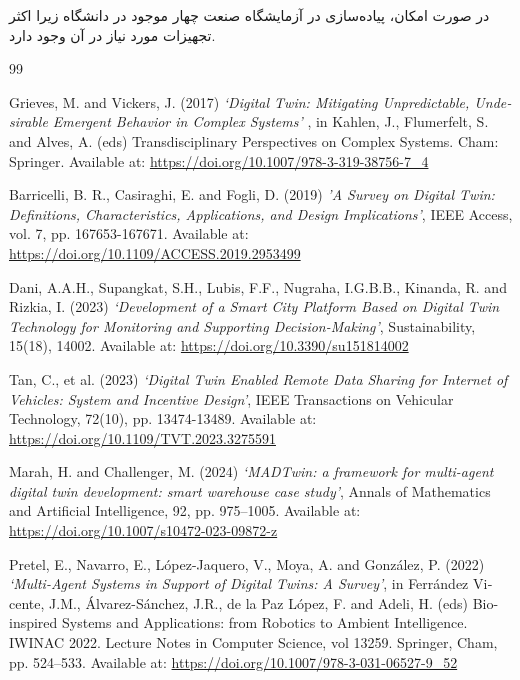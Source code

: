 \documentclass[a4paper,fleqn]{article}
\begin{document}
 در صورت امکان، پیاده‌سازی در آزمایشگاه صنعت چهار موجود در دانشگاه زیرا اکثر تجهیزات مورد نیاز در آن وجود دارد.
 
 


\newpage

\renewcommand{\bibname}{مراجع}



\setLTRbibitems

\begin{thebibliography}{99}

\begin{latin}

Grieves, M. and Vickers, J. (2017) 
\textit{‘Digital Twin: Mitigating Unpredictable, Undesirable Emergent Behavior in Complex Systems’}
, in Kahlen, J., Flumerfelt, S. and Alves, A. (eds) Transdisciplinary Perspectives on Complex Systems. Cham: Springer. Available at: \url{https://doi.org/10.1007/978-3-319-38756-7_4} 

Barricelli, B. R., Casiraghi, E. and Fogli, D. (2019) \textit{'A Survey on Digital Twin: Definitions, Characteristics, Applications, and Design Implications'}, IEEE Access, vol. 7, pp. 167653-167671. Available at: \url{https://doi.org/10.1109/ACCESS.2019.2953499}

Dani, A.A.H., Supangkat, S.H., Lubis, F.F., Nugraha, I.G.B.B., Kinanda, R. and Rizkia, I. (2023) \textit{‘Development of a Smart City Platform Based on Digital Twin Technology for Monitoring and Supporting Decision-Making’}, Sustainability, 15(18), 14002. Available at: \url{https://doi.org/10.3390/su151814002}

Tan, C., et al. (2023) \textit{‘Digital Twin Enabled Remote Data Sharing for Internet of Vehicles: System and Incentive Design’}, IEEE Transactions on Vehicular Technology, 72(10), pp. 13474-13489. Available at: \url{https://doi.org/10.1109/TVT.2023.3275591}

Marah, H. and Challenger, M. (2024) \textit{‘MADTwin: a framework for multi-agent digital twin development: smart warehouse case study’}, Annals of Mathematics and Artificial Intelligence, 92, pp. 975–1005. Available at: \url{https://doi.org/10.1007/s10472-023-09872-z}

Pretel, E., Navarro, E., López-Jaquero, V., Moya, A. and González, P. (2022) \textit{‘Multi-Agent Systems in Support of Digital Twins: A Survey’}, in Ferrández Vicente, J.M., Álvarez-Sánchez, J.R., de la Paz López, F. and Adeli, H. (eds) Bio-inspired Systems and Applications: from Robotics to Ambient Intelligence. IWINAC 2022. Lecture Notes in Computer Science, vol 13259. Springer, Cham, pp.  524–533. Available at: \url{https://doi.org/10.1007/978-3-031-06527-9_52}


\end{latin}

\end{thebibliography}
\end{document}
